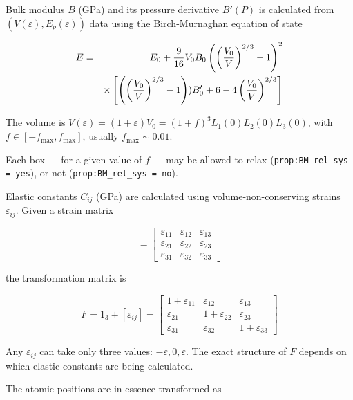 \documentclass[a4paper,12pt,pdftex,onecolumn]{article}
\begin{document}
Bulk modulus $B$ (GPa) and its pressure derivative $B'(P)$ is calculated from
$(V(\varepsilon), E_p(\varepsilon))$ data using the Birch-Murnaghan equation of state

\begin{eqnarray}
E &=& E_0 + {9 \over 16} V_0 B_0 \left( \left({V_0 \over V}\right)^{2/3} - 1 \right)^2 \nonumber \\
  & & \times 
\left[
\left( \left({V_0 \over V}\right)^{2/3} - 1 \right)) B'_0
+ 6 - 4 \left({V_0 \over V}\right)^{2/3}
\right]
\end{eqnarray}

The volume is $V(\varepsilon) = (1 + \varepsilon) V_0
= (1+f)^3 L_1(0) L_2(0) L_3(0)$, with $f \in [-f_{\mathrm{max}}, f_{\mathrm{max}}]$, usually
$f_{\mathrm{max}} \sim 0.01$.

Each box --- for a given value of $f$ --- may be allowed to
relax (\verb+prop:BM_rel_sys = yes+),
or not (\verb+prop:BM_rel_sys = no+).


Elastic constants $C_{ij}$ (GPa) are calculated using volume-non-conserving strains
$\varepsilon_{ij}$. Given a strain matrix

\begin{equation}
[\varepsilon_{ij}] =
\left[
\begin{array}{ccc}
\varepsilon_{11} & \varepsilon_{12} & \varepsilon_{13} \\
\varepsilon_{21} & \varepsilon_{22} & \varepsilon_{23} \\
\varepsilon_{31} & \varepsilon_{32} & \varepsilon_{33}
\end{array}
\right]
\end{equation}

the transformation matrix is

\begin{equation}
F = 1_3 + [\varepsilon_{ij}] =
\left[
\begin{array}{ccc}
1+\varepsilon_{11} & \varepsilon_{12} & \varepsilon_{13} \\
\varepsilon_{21} & 1+\varepsilon_{22} & \varepsilon_{23} \\
\varepsilon_{31} & \varepsilon_{32} & 1+\varepsilon_{33}
\end{array}
\right]
\end{equation}

Any $\varepsilon_{ij}$ can take only three values: $-\varepsilon, 0, \varepsilon$.
The exact structure of $F$ depends on which elastic constants are being
calculated.

The atomic positions are in essence transformed as
\end{document}
